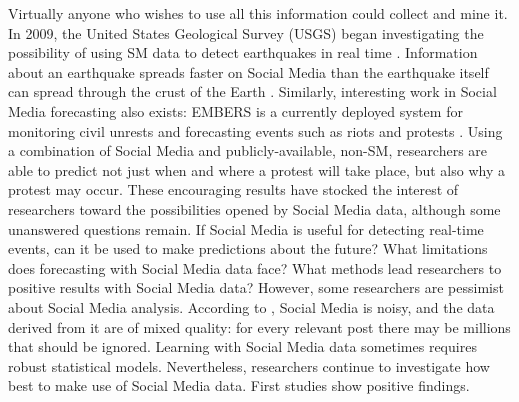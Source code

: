 \documentclass[]{book}
\begin{document}
Virtually anyone who wishes to use all this information could collect
and mine it. In 2009, the United States Geological Survey (USGS) began
investigating the possibility of using SM data to detect earthquakes in
real time \citep{ellis2015usgs}. Information about an earthquake spreads
faster on Social Media than the earthquake itself can spread through the
crust of the Earth \citep{konkel2013tweets}. Similarly, interesting work
in Social Media forecasting also exists: EMBERS is a currently deployed
system for monitoring civil unrests and forecasting events such as riots
and protests \citep{ramakrishnan2014beating}. Using a combination of
Social Media and publicly-available, non-SM, researchers are able to
predict not just when and where a protest will take place, but also why
a protest may occur. These encouraging results have stocked the interest
of researchers toward the possibilities opened by Social Media data,
although some unanswered questions remain. If Social Media is useful for
detecting real-time events, can it be used to make predictions about the
future? What limitations does forecasting with Social Media data face?
What methods lead researchers to positive results with Social Media
data? However, some researchers are pessimist about Social Media
analysis. According to \citep{ruths2014social, weller2015accepting},
Social Media is noisy, and the data derived from it are of mixed
quality: for every relevant post there may be millions that should be
ignored. Learning with Social Media data sometimes requires robust
statistical models. Nevertheless, researchers continue to investigate
how best to make use of Social Media data. First studies show positive
findings.
\end{document}
